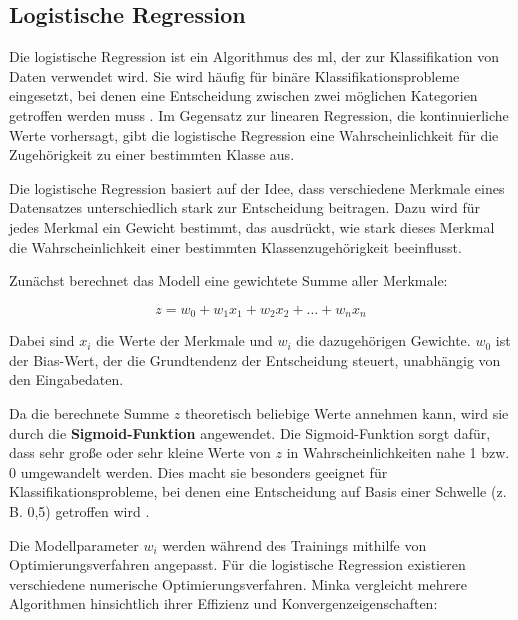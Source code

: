 \subsection{Logistische Regression}
Die logistische Regression ist ein Algorithmus des \gls{ml}, der zur Klassifikation von Daten verwendet wird. Sie wird häufig für binäre Klassifikationsprobleme eingesetzt, bei denen eine Entscheidung zwischen zwei möglichen Kategorien getroffen werden muss \cite{Hastie2009}. Im Gegensatz zur linearen Regression, die kontinuierliche Werte vorhersagt, gibt die logistische Regression eine Wahrscheinlichkeit für die Zugehörigkeit zu einer bestimmten Klasse aus.

Die logistische Regression basiert auf der Idee, dass verschiedene Merkmale eines Datensatzes unterschiedlich stark zur Entscheidung beitragen. Dazu wird für jedes Merkmal ein Gewicht bestimmt, das ausdrückt, wie stark dieses Merkmal die Wahrscheinlichkeit einer bestimmten Klassenzugehörigkeit beeinflusst. 

Zunächst berechnet das Modell eine gewichtete Summe aller Merkmale:

\[
z = w_0 + w_1 x_1 + w_2 x_2 + \dots + w_n x_n
\]

Dabei sind \(x_i\) die Werte der Merkmale und \(w_i\) die dazugehörigen Gewichte. \(w_0\) ist der Bias-Wert, der die Grundtendenz der Entscheidung steuert, unabhängig von den Eingabedaten.

Da die berechnete Summe \(z\) theoretisch beliebige Werte annehmen kann, wird sie durch die \textbf{Sigmoid-Funktion} angewendet.
Die Sigmoid-Funktion sorgt dafür, dass sehr große oder sehr kleine Werte von \(z\) in Wahrscheinlichkeiten nahe 1 bzw. 0 umgewandelt werden. Dies macht sie besonders geeignet für Klassifikationsprobleme, bei denen eine Entscheidung auf Basis einer Schwelle (z. B. 0,5) getroffen wird \cite{Bishop2006}. 

Die Modellparameter \(w_i\) werden während des Trainings mithilfe von Optimierungsverfahren angepasst. 
Für die logistische Regression existieren verschiedene numerische Optimierungsverfahren. Minka \cite{Minka2003} vergleicht mehrere Algorithmen hinsichtlich ihrer Effizienz und Konvergenzeigenschaften:


